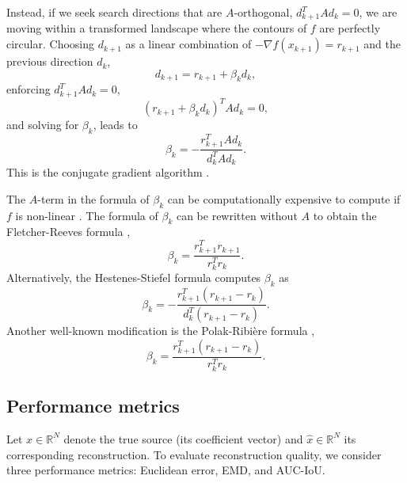 Instead, if we seek search directions that are $A$-orthogonal, $d_{k+1}^T A d_k = 0$, we are moving within a transformed landscape where the contours of $f$ are perfectly circular. Choosing $d_{k+1}$ as a linear combination of $-\nabla f(x_{k+1}) = r_{k+1}$ and the previous direction $d_k$,
\begin{equation*}
    d_{k+1} = r_{k+1} + \beta_k d_k,
\end{equation*}
enforcing $d_{k+1}^T A d_k = 0$,
\begin{equation*}
    (r_{k+1} + \beta_k d_k)^T A d_k = 0,
\end{equation*}
and solving for $\beta_k$, leads to
\begin{equation*}
    \beta_k = -
    \frac{r_{k+1}^T A d_k}
	     {d_k^T A d_k}.
\end{equation*}
This is the conjugate gradient algorithm \cite{chong2023introduction}.

The $A$-term in the formula of $\beta_k$ can be computationally expensive to compute if $f$ is non-linear \cite{chong2023introduction}. The formula of $\beta_k$ can be rewritten without $A$ to obtain the Fletcher-Reeves formula \cite{fletcherFunctionMinimizationConjugate1964},
\begin{equation*}
    \beta_k =
    \frac{r_{k+1}^T r_{k+1}}
	     {r_k^T r_k}.
\end{equation*}
Alternatively, the Hestenes-Stiefel formula \cite{hestenesMethodsConjugateGradients1952} computes $\beta_k$ as
\begin{equation*}
    \beta_k = -
    \frac{r_{k+1}^T (r_{k+1} - r_k)}
	     {d_k^T(r_{k+1} - r_k)}.
\end{equation*}
Another well-known modification is the Polak-Ribière formula \cite{polakNoteConvergenceMethodes1969},
\begin{equation*}
    \beta_k = 
    \frac{r_{k+1}^T(r_{k+1} - r_k)}
         {r_k^T r_k}.
\end{equation*}


\subsection{Performance metrics}\label{appendix:performance_metrics}
Let $x \in \mathbb{R}^N$ denote the true source (its coefficient vector) and $\hat x \in \mathbb{R}^N$ its corresponding reconstruction. To evaluate reconstruction quality, we consider three performance metrics: Euclidean error, EMD, and AUC-IoU.


